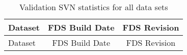 \begin{longtable}[c]{|l|c|c|}
\caption[Validation SVN Statistics]{Validation SVN statistics for all data sets}
\label{validation_svn_stats}
\\ \hline
Dataset  &  FDS Build Date  &  FDS Revision \\ \hline \hline
\endfirsthead
\hline
Dataset  &  FDS Build Date  &  FDS Revision \\ \hline \hline
\endhead
\end{longtable}
